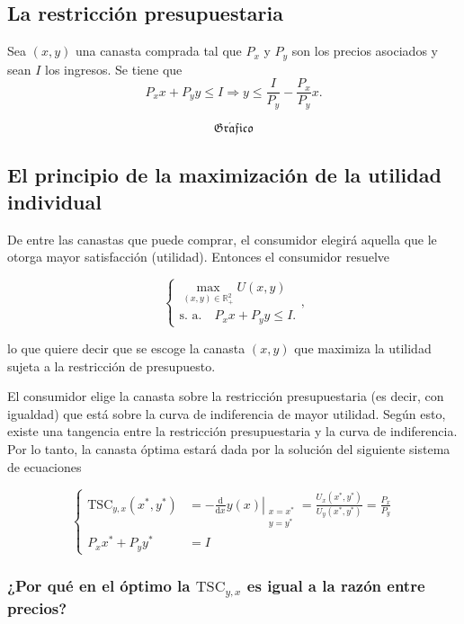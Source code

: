 \documentclass{report}
\newcommand{\GRAF}{\begin{center}$$\mathfrak{Gr\acute{a}fico}$$\end{center}}
\begin{document}
\subsection{La restricción presupuestaria}

Sea $\left(x,y\right)$ una canasta comprada tal que $P_x$ y $P_y$ son los precios asociados y sean $I$ los ingresos. Se tiene que
$$ P_x x + P_y y \leq I \Rightarrow y \leq \frac{I}{P_y} - \frac{P_x}{P_y}x\text{.}$$

\GRAF


\subsection{El principio de la maximización de la utilidad individual}

De entre las canastas que puede comprar, el consumidor elegirá aquella que le otorga mayor satisfacción (utilidad). Entonces el consumidor resuelve

$$\left\{
\begin{matrix}
\displaystyle{\max_{(x,y)\in\mathbb{R}_+^2}U\!\left(x,y\right)} \\
\text{s. a.}\quad P_xx+P_yy\le I\text{.}
\end{matrix}\right.\text{,}$$

lo que quiere decir que se escoge la canasta $\left(x,y\right)$ que maximiza la utilidad sujeta a la restricción de presupuesto.

El consumidor elige la canasta sobre la restricción presupuestaria (es decir, con igualdad) que está sobre la curva de indiferencia de mayor utilidad. Según esto, existe una tangencia entre la restricción presupuestaria y la curva de indiferencia. Por lo tanto, la canasta óptima estará dada por la solución del siguiente sistema de ecuaciones

$$\left\{
\begin{align}
\mathrm{TSC}_{y,x}\!\left(x^*,y^*\right)&=\left.-\frac{\mathrm{d}}{\mathrm{d}x}y\!\left(x\right)\right|_{\begin{smallmatrix}x=x^*\\ y=y^*\end{smallmatrix}}=\frac{U_x\!\left(x^*,y^*\right)}{U_y\!\left(x^*,y^*\right)}=\frac{P_x}{P_y}\\
P_xx^*+P_yy^*&=I
\end{align}\right.$$

\subsubsection{¿Por qué en el óptimo la $\mathrm{TSC}_{y,x}$ es igual a la razón entre precios?}
\end{document}
